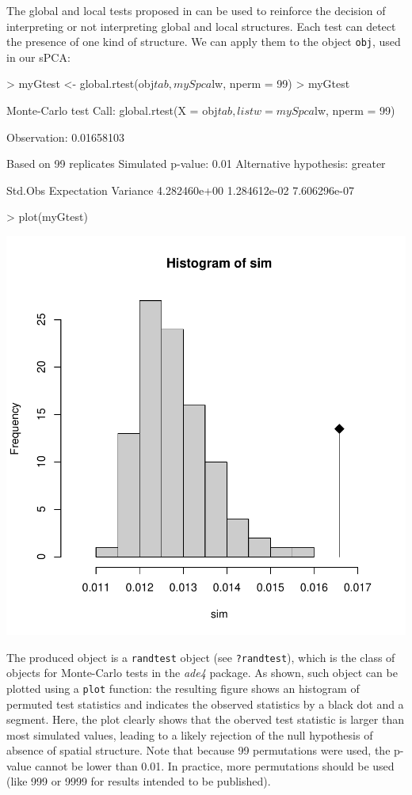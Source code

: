 \documentclass{article}
\begin{document}
The global and local tests proposed in \cite{tjart04} can
be used to reinforce the decision of interpreting or not
interpreting global and local structures.
Each test can detect the presence of one kind of structure.
We can apply them to the object \texttt{obj}, used in our sPCA:
\begin{Schunk}
\begin{Sinput}
> myGtest <- global.rtest(obj$tab, mySpca$lw, nperm = 99)
> myGtest
\end{Sinput}
\begin{Soutput}
Monte-Carlo test
Call: global.rtest(X = obj$tab, listw = mySpca$lw, nperm = 99)

Observation: 0.01658103 

Based on 99 replicates
Simulated p-value: 0.01 
Alternative hypothesis: greater 

     Std.Obs  Expectation     Variance 
4.282460e+00 1.284612e-02 7.606296e-07 
\end{Soutput}
\begin{Sinput}
> plot(myGtest)
\end{Sinput}
\end{Schunk}
\includegraphics{figs/spca-globalrtest}

\noindent The produced object is a \texttt{randtest} object (see
\texttt{?randtest}), which is the class of objects for Monte-Carlo
tests in the \textit{ade4} package.
As shown, such object can be plotted using a \texttt{plot} function:
the resulting figure shows an histogram of permuted test statistics
and indicates the observed statistics by a black dot and a segment.
Here, the plot clearly shows that the oberved test statistic is larger
than most simulated values, leading to a likely rejection of
the null hypothesis of absence of spatial structure.
Note that because 99 permutations were used, the p-value cannot be
lower than 0.01.
In practice, more permutations should be used (like 999 or 9999 for results
intended to be published).
\end{document}
